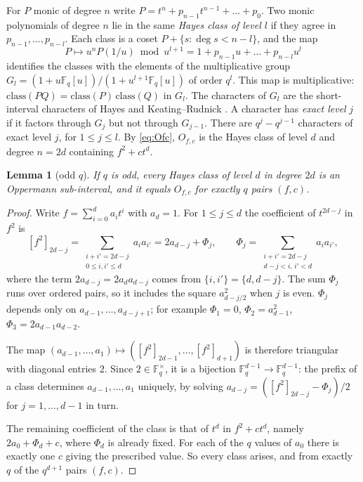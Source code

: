 \documentclass[11pt,a4paper]{amsart}
\newtheorem{lemma}[theorem]{Lemma}
\theoremstyle{definition}
\theoremstyle{remark}
\newcommand{\F}{\mathbb{F}}
\begin{document}
For $P$ monic of degree $n$ write $P=t^n+p_{n-1}t^{n-1}+\dots+p_0$. Two monic polynomials of degree $n$ lie in the
same \emph{Hayes class of level $l$} if they agree in $p_{n-1},\dots,p_{n-l}$. Each class is a coset
$P+\{s:\deg s<n-l\}$, and the map
\[
P\mapsto u^nP(1/u)\bmod u^{l+1}=1+p_{n-1}u+\dots+p_{n-l}u^l
\]
identifies the classes with the elements of the multiplicative group $G_l=(1+u\F_q[u])/(1+u^{l+1}\F_q[u])$ of order
$q^l$. This map is multiplicative: $\mathrm{class}(PQ)=\mathrm{class}(P)\,\mathrm{class}(Q)$ in $G_l$. The characters
of $G_l$ are the short-interval characters of Hayes \cite{Hayes} and Keating--Rudnick \cite{KR}. A character has
\emph{exact level} $j$ if it factors through $G_j$ but not through $G_{j-1}$. There are $q^j-q^{j-1}$ characters of
exact level $j$, for $1\le j\le l$. By
\eqref{eq:Ofc}, $O_{f,c}$ is the Hayes class of level $d$ and degree $n=2d$ containing $f^2+ct^d$.

\begin{lemma}[odd $q$]\label{lem:odd}
If $q$ is odd, every Hayes class of level $d$ in degree $2d$ is an Oppermann sub-interval, and it equals $O_{f,c}$ for
exactly $q$ pairs $(f,c)$.
\end{lemma}

\begin{proof}
Write $f=\sum_{i=0}^da_it^i$ with $a_d=1$. For $1\le j\le d$ the coefficient of $t^{2d-j}$ in $f^2$ is
\[
[f^2]_{2d-j}=\sum_{\substack{i+i'=2d-j\\ 0\le i,i'\le d}}a_ia_{i'}
=2a_{d-j}+\Phi_j,\qquad
\Phi_j=\sum_{\substack{i+i'=2d-j\\ d-j<i,\,i'<d}}a_ia_{i'} ,
\]
where the term $2a_{d-j}=2a_da_{d-j}$ comes from $\{i,i'\}=\{d,d-j\}$. The sum $\Phi_j$ runs over ordered pairs, so
it includes the square $a_{d-j/2}^2$ when $j$ is even. $\Phi_j$ depends only on $a_{d-1},\dots,a_{d-j+1}$; for
example $\Phi_1=0$, $\Phi_2=a_{d-1}^2$, $\Phi_3=2a_{d-1}a_{d-2}$.

The map $(a_{d-1},\dots,a_1)\mapsto([f^2]_{2d-1},\dots,[f^2]_{d+1})$ is therefore triangular with diagonal entries
$2$. Since $2\in\F_q^\times$, it is a bijection $\F_q^{d-1}\to\F_q^{d-1}$: the prefix of a class determines
$a_{d-1},\dots,a_1$ uniquely, by solving $a_{d-j}=([f^2]_{2d-j}-\Phi_j)/2$ for $j=1,\dots,d-1$ in turn.

The remaining coefficient of the class is that of $t^d$ in $f^2+ct^d$, namely $2a_0+\Phi_d+c$, where $\Phi_d$ is
already fixed. For each of the $q$ values of $a_0$ there is exactly one $c$ giving the prescribed value. So every
class arises, and from exactly $q$ of the $q^{d+1}$ pairs $(f,c)$.
\end{proof}
\end{document}

